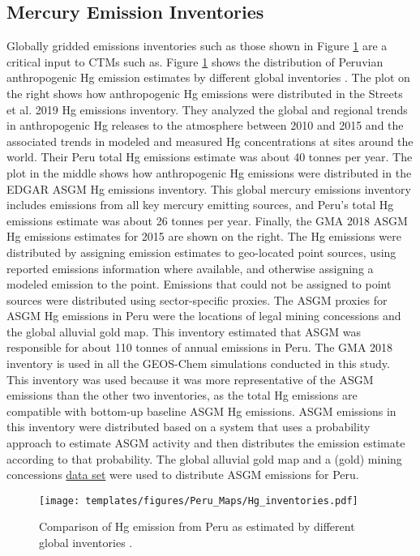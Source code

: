 \subsection{Mercury Emission Inventories}
\begin{flushleft}


Globally gridded emissions inventories such as those shown in Figure \ref{fig:Hg_inventories} are a critical input to CTMs such as\gc. Figure \ref{fig:Hg_inventories} shows the distribution of Peruvian anthropogenic Hg emission estimates by different global inventories \cite{united_nations_environment_programme_technical_2019,steenhuisen_development_2019,muntean_evaluating_2018,streets_global_2019}. The plot on the right shows how anthropogenic Hg emissions were distributed in the  Streets et al. 2019 Hg emissions inventory\cite{streets_global_2019}. They analyzed the global and regional trends in anthropogenic Hg releases to the atmosphere between 2010 and 2015 and the associated trends in modeled and measured Hg concentrations at sites around the world. Their Peru total Hg emissions estimate was about 40 tonnes per year. The plot in the middle shows how anthropogenic Hg emissions were distributed in the EDGAR ASGM Hg emissions inventory\cite{muntean_evaluating_2018}. This global mercury emissions inventory includes emissions from all key mercury emitting sources, and Peru's total Hg emissions estimate was about 26 tonnes per year. Finally, the GMA 2018 ASGM Hg emissions estimates for 2015 are shown on the right. The Hg emissions were distributed by assigning emission estimates to geo-located point sources, using reported emissions information where available, and otherwise assigning a modeled emission to the point. Emissions that could not be assigned to point sources were distributed using sector-specific proxies. The ASGM proxies for ASGM Hg emissions in Peru were the locations of legal mining concessions and the global alluvial gold map. This inventory estimated that ASGM was responsible for about 110 tonnes of annual emissions in Peru. The GMA 2018 inventory is used in all the GEOS-Chem simulations conducted in this study. This inventory was used because it was more representative of the ASGM emissions than the other two inventories, as the total Hg emissions are compatible with bottom-up baseline ASGM Hg emissions. ASGM emissions in this inventory were distributed based on a system that uses a probability approach to estimate ASGM activity and then distributes the emission estimate according to that probability\cite{steenhuisen_development_2019}. The global alluvial gold map and a (gold) mining concessions  \href{(https://data.globalforestwatch.org/search?collection=Dataset&q=mining)}{data set} were used to distribute ASGM emissions for Peru. 
\end{flushleft}
\begin{figure}[H]
  \texttt{[image: templates/figures/Peru\_Maps/Hg\_inventories.pdf]}
  \centering
  \caption{Comparison of Hg emission from Peru as estimated by different global inventories \cite{united_nations_environment_programme_technical_2019,steenhuisen_development_2019,muntean_evaluating_2018,streets_global_2019}.}
  \label{fig:Hg_inventories}
\end{figure}
\FloatBarrier


